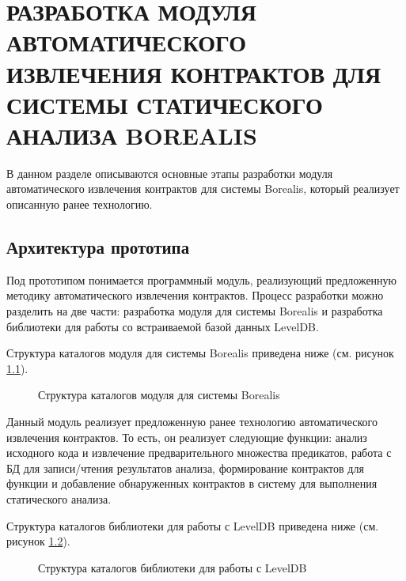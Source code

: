 \chapter{РАЗРАБОТКА МОДУЛЯ АВТОМАТИЧЕСКОГО ИЗВЛЕЧЕНИЯ КОНТРАКТОВ ДЛЯ СИСТЕМЫ СТАТИЧЕСКОГО АНАЛИЗА BOREALIS}
\label{chapter:developing}
В данном разделе описываются основные этапы разработки модуля автоматического извлечения контрактов для системы Borealis, который реализует описанную ранее технологию.

\section{Архитектура прототипа}
Под прототипом понимается программный модуль, реализующий предложенную методику автоматического извлечения контрактов. Процесс разработки можно разделить на две части: разработка модуля для системы Borealis и разработка библиотеки для работы со встраиваемой базой данных LevelDB\cite{leveldb}.

Структура каталогов модуля для системы Borealis приведена ниже (см. рисунок \ref{image:borealisStructure}).
\begin{figure}[h!]
\caption{Структура каталогов модуля для системы Borealis}
\label{image:borealisStructure}
\end{figure}

Данный модуль реализует предложенную ранее технологию автоматического извлечения контрактов. То есть, он реализует следующие функции: анализ исходного кода и извлечение предварительного множества предикатов, работа с БД для записи/чтения результатов анализа, формирование контрактов для функции и добавление обнаруженных контрактов в систему для выполнения статического анализа.

Структура каталогов библиотеки для работы с LevelDB приведена ниже (см. рисунок \ref{image:leveldbStructure}).
\begin{figure}[h!]
\caption{Структура каталогов библиотеки для работы с LevelDB}
\label{image:leveldbStructure}
\end{figure}

